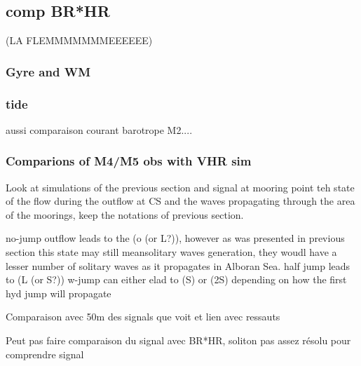 \subsection{comp BR*HR}
(LA FLEMMMMMMMEEEEEE)
\subsubsection{Gyre and WM}

\subsubsection{tide}
aussi comparaison courant barotrope M2....

\subsubsection{Comparions of M4/M5 obs with VHR sim}
Look at simulations of the previous section and signal at mooring point teh state of the flow during the outflow at CS and the waves propagating through the area of the moorings, keep the notations of previous section.

no-jump outflow leads to the (o (or L?)), however as was presented in previous section this state may still meansolitary waves generation, they woudl have a lesser number of solitary waves as it propagates in Alboran Sea.
half jump leads to (L (or S?))  
w-jump can either elad to (S) or (2S) depending on how the first hyd jump will propagate






Comparaison avec 50m des signals que voit et lien avec ressauts

Peut pas faire comparaison du signal avec BR*HR, soliton pas assez résolu pour comprendre signal


